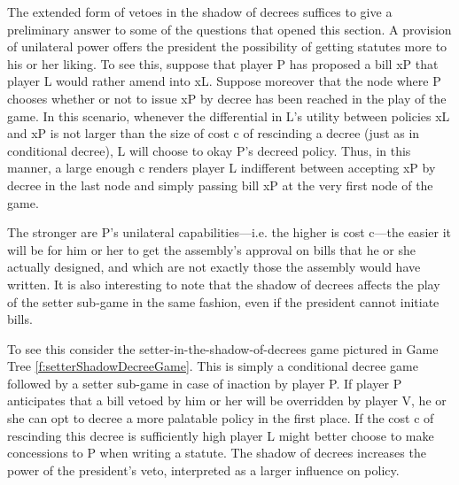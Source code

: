 The extended form of vetoes in the shadow of decrees suffices to give a preliminary answer to some of the questions that opened this section.  A provision of unilateral power offers the president the possibility of getting statutes more to his or her liking.  To see this, suppose that player P has proposed a bill xP that player L would rather amend into xL.  Suppose moreover that the node where P chooses whether or not to issue xP by decree has been reached in the play of the game.  In this scenario, whenever the differential in L's utility between policies xL and xP is not larger than the size of cost c of rescinding a decree (just as in conditional decree), L will choose to okay P's decreed policy.  Thus, in this manner, a large enough c renders player L indifferent between accepting xP by decree in the last node and simply passing bill xP at the very first node of the game.

The stronger are P's unilateral capabilities---i.e. the higher is cost c---the easier it will be for him or her to get the assembly's approval on bills that he or she actually designed, and which are not exactly those the assembly would have written.  It is also interesting to note that the shadow of decrees affects the play of the setter sub-game in the same fashion, even if the president cannot initiate bills. 

To see this consider the setter-in-the-shadow-of-decrees game pictured in Game Tree \ref{f:setterShadowDecreeGame}.  This is simply a conditional decree game followed by a setter sub-game in case of inaction by player P.  If player P anticipates that a bill vetoed by him or her will be overridden by player V, he or she can opt to decree a more palatable policy in the first place.  If the cost c of rescinding this decree is sufficiently high player L might better choose to make concessions to P when writing a statute.  The shadow of decrees increases the power of the president's veto, interpreted as a larger influence on policy.  

